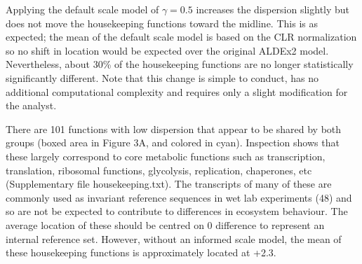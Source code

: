 \documentclass[
]{article}
\begin{document}
Applying the default scale model of \(\gamma=0.5\) increases the
dispersion slightly but does not move the housekeeping functions toward
the midline. This is as expected; the mean of the default scale model is
based on the CLR normalization so no shift in location would be expected
over the original ALDEx2 model. Nevertheless, about 30\% of the
housekeeping functions are no longer statistically significantly
different. Note that this change is simple to conduct, has no additional
computational complexity and requires only a slight modification for the
analyst.

There are 101 functions with low dispersion that appear to be shared by
both groups (boxed area in Figure 3A, and colored in cyan). Inspection
shows that these largely correspond to core metabolic functions such as
transcription, translation, ribosomal functions, glycolysis,
replication, chaperones, etc (Supplementary file housekeeping.txt). The
transcripts of many of these are commonly used as invariant reference
sequences in wet lab experiments (48) and so are not be expected to
contribute to differences in ecosystem behaviour. The average location
of these should be centred on 0 difference to represent an internal
reference set. However, without an informed scale model, the mean of
these housekeeping functions is approximately located at +2.3.
\end{document}
